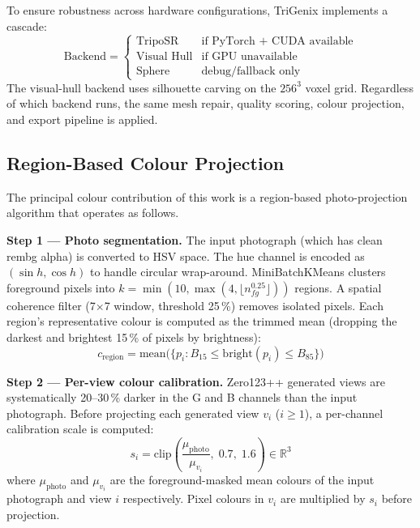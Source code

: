 \documentclass[conference]{IEEEtran}
\begin{document}
To ensure robustness across hardware configurations, TriGenix implements a cascade:
\begin{equation}
\text{Backend} = \begin{cases}
\text{TripoSR} & \text{if PyTorch + CUDA available} \\
\text{Visual Hull} & \text{if GPU unavailable} \\
\text{Sphere} & \text{debug/fallback only}
\end{cases}
\end{equation}
The visual-hull backend uses silhouette carving on the $256^3$ voxel grid. Regardless of which backend runs,
the same mesh repair, quality scoring, colour projection, and export pipeline is applied.

\subsection{Region-Based Colour Projection}

The principal colour contribution of this work is a region-based photo-projection algorithm that operates as follows.

\textbf{Step 1 — Photo segmentation.}
The input photograph (which has clean rembg alpha) is converted to HSV space. The hue channel is
encoded as $(\sin h, \cos h)$ to handle circular wrap-around. MiniBatchKMeans clusters foreground pixels
into $k = \min(10, \max(4, \lfloor n_{fg}^{0.25} \rfloor))$ regions. A spatial coherence filter (7$\times$7
window, threshold 25\,\%) removes isolated pixels. Each region's representative colour is computed as the
trimmed mean (dropping the darkest and brightest 15\,\% of pixels by brightness):
\begin{equation}
c_{\text{region}} = \text{mean}\bigl(\{p_i : B_{15} \le \mathrm{bright}(p_i) \le B_{85}\}\bigr)
\end{equation}

\textbf{Step 2 — Per-view colour calibration.}
Zero123++ generated views are systematically 20--30\,\% darker in the G and B channels than the input photograph.
Before projecting each generated view $v_i$ ($i \ge 1$), a per-channel calibration scale is computed:
\begin{equation}
s_i = \mathrm{clip}\!\left(\frac{\mu_{\text{photo}}}{\mu_{v_i}},\; 0.7,\; 1.6\right) \in \mathbb{R}^3
\end{equation}
where $\mu_{\text{photo}}$ and $\mu_{v_i}$ are the foreground-masked mean colours of the input photograph
and view $i$ respectively. Pixel colours in $v_i$ are multiplied by $s_i$ before projection.
\end{document}
